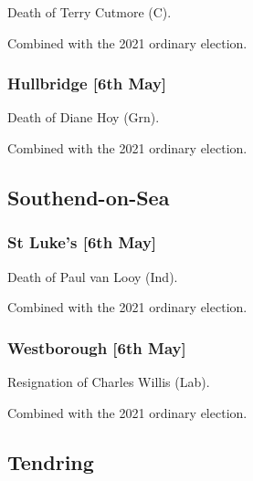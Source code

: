 \documentclass[a4paper,openany]{book}
\begin{document}
\begin{resultsiii}

Death of Terry Cutmore (C).

Combined with the 2021 ordinary election.

\subsubsection*{Hullbridge \hspace*{\fill}\nolinebreak[1]%
	\enspace\hspace*{\fill}
	[6th May]}


Death of Diane Hoy (Grn).

Combined with the 2021 ordinary election.

\subsection*{Southend-on-Sea}

\subsubsection*{St Luke's \hspace*{\fill}\nolinebreak[1]%
	\enspace\hspace*{\fill}
	[6th May]}


Death of Paul van Looy (Ind).

Combined with the 2021 ordinary election.

\subsubsection*{Westborough \hspace*{\fill}\nolinebreak[1]%
	\enspace\hspace*{\fill}
	[6th May]}


Resignation of Charles Willis (Lab).

Combined with the 2021 ordinary election.

\subsection*{Tendring}


\end{resultsiii}
\end{document}
